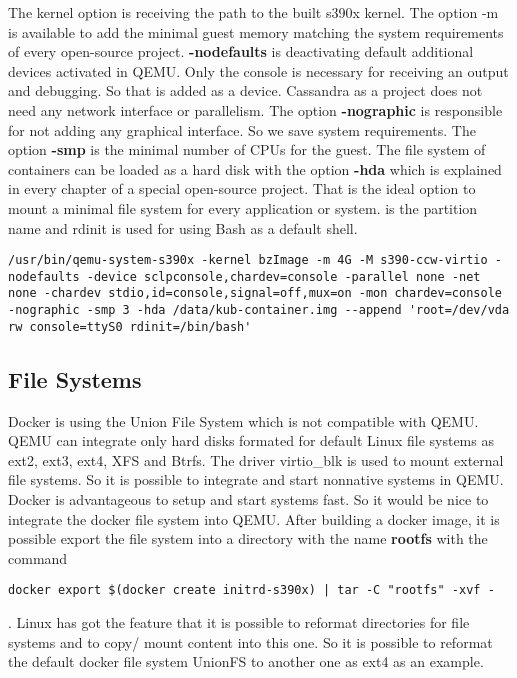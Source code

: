 The kernel option is receiving the path to the built s390x kernel. 
The option -m is available to add the minimal guest memory matching the system requirements of every open-source project. 
\textbf{-nodefaults} is deactivating default additional devices activated in QEMU. 
Only the console is necessary for receiving an output and debugging. 
So that is added as a device. Cassandra as a project does not need any network interface or parallelism. The 
option \textbf{-nographic} is responsible for not adding any graphical interface. 
So we save system requirements. The option \textbf{-smp} is the minimal number of CPUs for the guest. 
The file system of containers can be loaded as a hard disk with the option \textbf{-hda} which is explained in every chapter of a special open-source project. 
That is the ideal option to mount a minimal file system for every application or system. 
 is the partition name and rdinit is used for using Bash as a default shell. \\


\begin{lstlisting}[style=BashInputStyle]
/usr/bin/qemu-system-s390x -kernel bzImage -m 4G -M s390-ccw-virtio -nodefaults -device sclpconsole,chardev=console -parallel none -net none -chardev stdio,id=console,signal=off,mux=on -mon chardev=console -nographic -smp 3 -hda /data/kub-container.img --append 'root=/dev/vda rw console=ttyS0 rdinit=/bin/bash'
\end{lstlisting}

\subsection{File Systems}

Docker is using the Union File System which is not compatible with QEMU.
QEMU can integrate only hard disks formated for default Linux file systems as ext2, ext3, ext4, XFS and Btrfs. 
The driver virtio\_blk is used to mount external file systems. So it is possible to integrate and start nonnative systems in QEMU. 
Docker is advantageous to setup and start systems fast. 
So it would be nice to integrate the docker file system into QEMU. After building a docker image, it is possible export the file system into a directory with the name \textbf{rootfs} with the command 
\begin{lstlisting}[style=BashInputStyle]
docker export $(docker create initrd-s390x) | tar -C "rootfs" -xvf -
\end{lstlisting}
.
Linux has got the feature that it is possible to reformat directories for file systems and to copy/ mount content into this one. So it is possible to reformat the default docker file system UnionFS to another one as ext4 as an example. 

